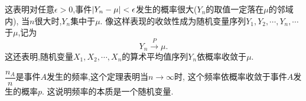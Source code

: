 这表明对任意$\epsilon > 0$,事件$\abs{Y_n - \mu} < \epsilon$发生的概率很大($Y_n$的取值一定落在$\mu$的邻域内),
当$n$很大时,$Y_n$集中于$\mu$.
像这样表现的收敛性成为随机变量序列$Y_1,Y_2,\cdots,Y_n,\cdots$于$\mu$,记为
\begin{equation}
    Y_n\xrightarrow{P}\mu.
\end{equation}
这还表明,随机变量$X_1,X_2,\cdots,X_n$的算术平均值序列${Y_n}$依概率收敛于$\mu$.

$\dfrac{n_A}{n}$是事件$A$发生的频率,这个定理表明当$n\to\infty$时,
这个频率依概率收敛于事件$A$发生的概率$p$.
这说明频率的本质是一个随机变量.